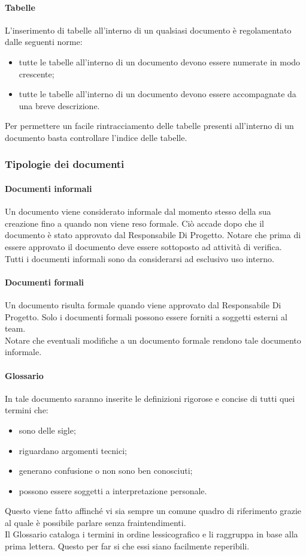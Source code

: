 			\paragraph{Tabelle}
				L’inserimento di tabelle all’interno di un qualsiasi documento è regolamentato dalle seguenti norme:
				\begin{itemize}
					\item tutte le tabelle all’interno di un documento devono essere numerate in modo crescente;
					\item tutte le tabelle all’interno di un documento devono essere accompagnate da una breve descrizione.
				\end{itemize}
				Per permettere un facile rintracciamento delle tabelle presenti all’interno di un documento basta controllare l’indice delle tabelle.
		\subsubsection{Tipologie dei documenti}
			\paragraph{Documenti informali}
				Un documento viene considerato informale dal momento stesso della sua creazione fino a quando non viene reso formale. Ciò accade dopo che il documento è stato approvato dal Responsabile Di Progetto. Notare che prima di essere approvato il documento deve essere sottoposto ad attività di verifica.\\
				Tutti i documenti informali sono da considerarsi ad esclusivo uso interno.
			\paragraph{Documenti formali}
				Un documento risulta formale quando viene approvato dal Responsabile Di Progetto. Solo i documenti formali possono essere forniti a soggetti esterni al team.\\
				Notare che eventuali modifiche a un documento formale rendono tale documento informale.
			\paragraph{Glossario}
				In tale documento saranno inserite le definizioni rigorose e concise di tutti quei termini che:
				\begin{itemize}
					\item sono delle sigle;
					\item riguardano argomenti tecnici;
					\item generano confusione o non sono ben conosciuti;
					\item possono essere soggetti a interpretazione personale.
				\end{itemize}
				Questo viene fatto affinché vi sia sempre un comune quadro di riferimento grazie al quale è possibile parlare senza fraintendimenti.\\
				Il Glossario cataloga i termini in ordine lessicografico e li raggruppa in base alla prima lettera. Questo per far si che essi siano facilmente reperibili.
